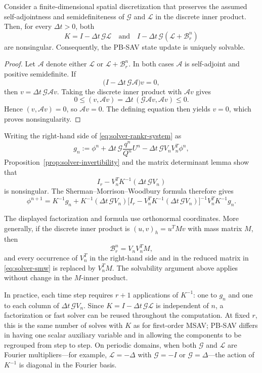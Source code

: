 \documentclass[10pt,onefignum,onetabnum,hidelinks]{siamart251216}
\begin{document}
\begin{proposition}
\label{prop:solver-invertibility}
Consider a finite-dimensional spatial discretization that preserves the assumed
self-adjointness and semidefiniteness of \(\mathcal G\) and \(\mathcal L\) in
the discrete inner product. Then, for every \(\Delta t>0\), both
\[
K=I-\Delta t\,\mathcal G\mathcal L
\quad\text{and}\quad
I-\Delta t\,\mathcal G(\mathcal L+\mathcal B_r^n)
\]
are nonsingular. Consequently, the PB-SAV state update is uniquely solvable.
\end{proposition}

\begin{proof}
Let \(\mathcal A\) denote either \(\mathcal L\) or
\(\mathcal L+\mathcal B_r^n\). In both cases \(\mathcal A\) is self-adjoint
and positive semidefinite. If
\[
\bigl(I-\Delta t\,\mathcal G\mathcal A\bigr)v=0,
\]
then \(v=\Delta t\,\mathcal G\mathcal A v\). Taking the discrete inner
product with \(\mathcal A v\) gives
\[
0\le (v,\mathcal A v)
=\Delta t\,(\mathcal G\mathcal A v,\mathcal A v)\le0.
\]
Hence \((v,\mathcal A v)=0\), so \(\mathcal A v=0\). The defining equation
then yields \(v=0\), which proves nonsingularity.
\end{proof}

Writing the right-hand side of \eqref{eq:solver-rankr-system} as
\[
g_n:=\phi^n+\Delta t\,\mathcal G\frac{q^n}{Q^n}U^n
-\Delta t\,\mathcal G V_nV_n^T\phi^n,
\]
Proposition~\ref{prop:solver-invertibility} and the matrix determinant lemma
show that
\[
I_r-V_n^T K^{-1}(\Delta t\,\mathcal G V_n)
\]
is nonsingular. The Sherman--Morrison--Woodbury formula
\cite{golub2013matrix} therefore gives
\begin{equation}
\phi^{n+1}
=
K^{-1}g_n
+
K^{-1}(\Delta t\,\mathcal G V_n)
\bigl[I_r-V_n^T K^{-1}(\Delta t\,\mathcal G V_n)\bigr]^{-1}
V_n^T K^{-1}g_n.
\label{eq:solver-smw}
\end{equation}

The displayed factorization and formula use orthonormal coordinates. More
generally, if the discrete inner product is
\((u,v)_h=u^TMv\) with mass matrix \(M\), then
\[
\mathcal B_r^n=V_nV_n^TM,
\]
and every occurrence of \(V_n^T\) in the right-hand side and in the reduced
matrix in \eqref{eq:solver-smw} is replaced by \(V_n^TM\). The solvability
argument above applies without change in the \(M\)-inner product.

In practice, each time step requires $r+1$ applications of $K^{-1}$: one to
$g_n$ and one to each column of $\Delta t\,\mathcal G V_n$. Since
$K=I-\Delta t\,\mathcal G\mathcal L$ is independent of $n$, a factorization
or fast solver can be reused throughout the computation. At fixed \(r\),
this is the same number of solves with $K$ as for first-order MSAV; PB-SAV
differs in having one scalar auxiliary variable and in allowing the components
to be regrouped from step to step. On periodic domains,
when both \(\mathcal G\) and \(\mathcal L\) are Fourier multipliers---for
example, \(\mathcal L=-\Delta\) with \(\mathcal G=-I\) or
\(\mathcal G=\Delta\)---the action of \(K^{-1}\) is diagonal in the Fourier
basis.
\end{document}
